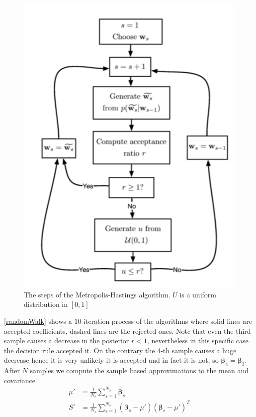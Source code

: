 \documentclass[12pt, letterpaper]{article}
\theoremstyle{definition}
\newcommand{\be}{\mathbf{\beta}}
\begin{document}
\begin{figure}
\centering
\includegraphics[scale=0.45]{img/MHAlgo}
\caption{The steps of the Metropolis-Hastings algorithm. $U$ is a uniform distribution in $[0,1]$}
\label{MHAlgo}
\end{figure}

\autoref{randomWalk} shows a 10-iteration process of the algorithms where solid lines are accepted coefficients, dashed lines are the rejected ones. Note that even the third sample causes a decrease in the posterior $r<1$, nevertheless in this specific case the decision rule accepted it. On the contrary the 4-th sample causes a huge decrease hence it is very unlikely it is accepted and in fact it is not, so $\be_4 = \be_3$. After $N$ samples we compute the sample based approximations to the mean and covariance
\begin{equation}
\begin{aligned}
\mu' &= \frac{1}{N_s} \sum_{s=1}^{N_s} \be_s\\
S' &= \frac{1}{N_s} \sum_{s=1}^{N_s} (\be_s-\mu')(\be_s-\mu')^T
\end{aligned}
\end{equation}
\end{document}
